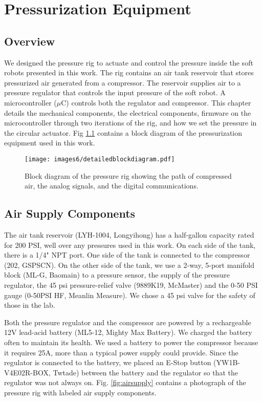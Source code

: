 \chapter{Pressurization Equipment}

\section{Overview}

We designed the pressure rig to actuate and control the pressure inside the soft robots presented in this work. The rig contains an air tank reservoir that stores pressurized air generated from a compressor. The reservoir supplies air to a pressure regulator that controls the input pressure of the soft robot. A microcontroller ($\mu$C) controls both the regulator and compressor. This chapter details the mechanical components, the electrical components, firmware on the microcontroller through two iterations of the rig, and how we set the pressure in the circular actuator. Fig \ref{fig:blockdiagram} contains a block diagram of the pressurization equipment used in this work. 

\begin{figure}[!ht]
    \centering
    \texttt{[image: images6/detailedblockdiagram.pdf]}
    \caption{Block diagram of the pressure rig showing the path of compressed air, the analog signals, and the digital communications.}
    \label{fig:blockdiagram}
\end{figure}

\section{Air Supply Components}

The air tank reservoir (LYH-1004, Longyihong) has a half-gallon capacity rated for 200 PSI, well over any pressures used in this work. On each side of the tank, there is a 1/4" NPT port. One side of the tank is connected to the compressor (202, GSPSCN). On the other side of the tank, we use a 2-way, 5-port manifold block (ML-G, Baomain) to a pressure sensor, the supply of the pressure regulator, the 45 psi pressure-relief valve (9889K19, McMaster) and the 0-50 PSI gauge (0-50PSI HF, Meanlin Measure). We chose a 45 psi valve for the safety of those in the lab.

Both the pressure regulator and the compressor are powered by a rechargeable 12V lead-acid battery (ML5-12, Mighty Max Battery). We charged the battery often to maintain its health. We used a battery to power the compressor because it requires 25A, more than a typical power supply could provide. Since the regulator is connected to the battery, we placed an E-Stop button (YW1B-V4E02R-BOX, Twtade) between the battery and the regulator so that the regulator was not always on. Fig. \ref{fig:airsupply} contains a photograph of the pressure rig with labeled air supply components. 

